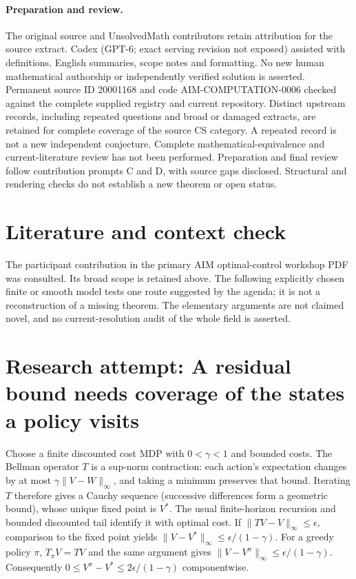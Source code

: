 \documentclass[11pt]{article}
\begin{document}
\paragraph{Preparation and review.}
The original source and UnsolvedMath contributors retain attribution for the source extract. Codex (GPT-6; exact serving revision not exposed) assisted with definitions, English summaries, scope notes and formatting. No new human mathematical authorship or independently verified solution is asserted. Permanent source ID 20001168 and code AIM-COMPUTATION-0006 checked against the complete supplied registry and current repository. Distinct upstream records, including repeated questions and broad or damaged extracts, are retained for complete coverage of the source CS category. A repeated record is not a new independent conjecture. Complete mathematical-equivalence and current-literature review has not been performed. Preparation and final review follow contribution prompts C and D, with source gaps disclosed. Structural and rendering checks do not establish a new theorem or open status.
\label{end:20001168}

\section{Literature and context check}
The participant contribution in the primary AIM optimal-control workshop
 PDF was consulted. Its broad scope is retained above. The following explicitly
 chosen finite or smooth model tests one route suggested by the agenda; it is
 not a reconstruction of a missing theorem. The elementary arguments are not
 claimed novel, and no current-resolution audit of the whole field is asserted.
\section{Research attempt: A residual bound needs coverage of the states a policy visits}
Choose a finite discounted cost MDP with $0<\gamma<1$ and bounded costs.
The Bellman operator $T$ is a sup-norm contraction: each action's expectation
changes by at most $\gamma\|V-W\|_\infty$, and taking a minimum preserves that
bound. Iterating $T$ therefore gives a Cauchy sequence (successive differences
form a geometric bound), whose unique fixed point is $V^*$. The usual
finite-horizon recursion and bounded discounted tail identify it with optimal cost.
If $\|TV-V\|_\infty\le\epsilon$, comparison to the fixed point yields
$\|V-V^*\|_\infty\le\epsilon/(1-\gamma)$. For a greedy policy $\pi$,
$T_\pi V=TV$ and the same argument gives
$\|V-V^\pi\|_\infty\le\epsilon/(1-\gamma)$.
Consequently $0\le V^\pi-V^*\le2\epsilon/(1-\gamma)$ componentwise.
\end{document}
